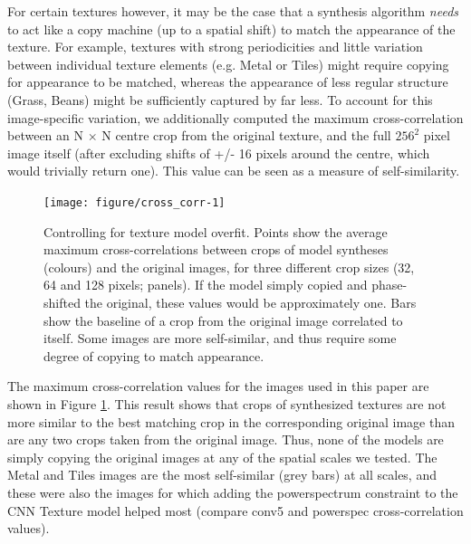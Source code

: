 \documentclass[article, 11pt,a4paper,natbib]{apa6}\usepackage[]{graphicx}\usepackage[]{color}
\newenvironment{knitrout}{}{} %
\begin{document}
For certain textures however, it may be the case that a synthesis algorithm \textit{needs} to act like a copy machine (up to a spatial shift) to match the appearance of the texture.
For example, textures with strong periodicities and little variation between individual texture elements (e.g. Metal or Tiles) might require copying for appearance to be matched, whereas the appearance of less regular structure (Grass, Beans) might be sufficiently captured by far less.
To account for this image-specific variation, we additionally computed the maximum cross-correlation between an N $\times$ N centre crop from the original texture, and the full $256^2$ pixel image itself (after excluding shifts of +/- 16 pixels around the centre, which would trivially return one).
This value can be seen as a measure of self-similarity.




\begin{knitrout}
\color{fgcolor}\begin{figure}
\texttt{[image: figure/cross\_corr-1]} \caption[Controlling for texture model overfit]{Controlling for texture model overfit. 
              Points show the average maximum cross-correlations between crops of model syntheses (colours) and the original images, for three different crop sizes (32, 64 and 128 pixels; panels). 
              If the model simply copied and phase-shifted the original, these values would be approximately one.
              Bars show the baseline of a crop from the original image correlated to itself.
              Some images are more self-similar, and thus require some degree of copying to match appearance.}\label{fig:cross_corr}
\end{figure}


\end{knitrout}


The maximum cross-correlation values for the images used in this paper are shown in Figure \ref{fig:cross_corr}. 
This result shows that crops of synthesized textures are not more similar to the best matching crop in the corresponding original image than are any two crops taken from the original image. 
Thus, none of the models are simply copying the original images at any of the spatial scales we tested. 
The Metal and Tiles images are the most self-similar (grey bars) at all scales, and these were also the images for which adding the powerspectrum constraint to the CNN Texture model helped most (compare conv5 and powerspec cross-correlation values).
\end{document}
